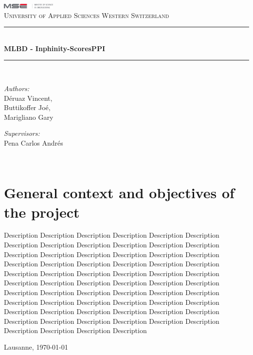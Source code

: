 \documentclass[a4paper,11pt]{report}
\newcommand{\School}{University of Applied Sciences Western Switzerland}
\newcommand{\Place}{Lausanne}
\newcommand{\Supervisors}{Pena Carlos Andrés}
\newcommand{\Authors}{Déruaz Vincent,\\ Buttikoffer Joé,\\ Marigliano Gary}
\newcommand{\Course}{MLBD - Inphinity-ScoresPPI}
\newcommand{\HRule}{\rule{\linewidth}{0.5mm}}
\begin{document}
\begin{titlepage}
    \begin{center}

        \includegraphics[width=0.2\textwidth]{img/mse_logo}~\\[0.2cm]
        \textsc{\small \School}\\[0.25cm]

        \HRule \\[0.2cm]
        { \large \bfseries \Course \\[0.05cm] }
        \HRule \\[0.5cm]

        \begin{minipage}[t]{0.4\textwidth}
            \begin{flushleft} \Large
                \emph{Authors:}\\ \Authors
            \end{flushleft}
        \end{minipage}
        \begin{minipage}[t]{0.4\textwidth}
            \begin{flushright} \Large
                \emph{Supervisors:}\\\Supervisors
            \end{flushright}
        \end{minipage}~\\[1.0cm]
        
        {\let\clearpage\relax \chapter{General context and objectives of the project}}

		Description Description Description Description Description Description Description Description Description Description Description Description Description Description Description Description Description Description Description Description Description Description Description Description Description Description Description Description Description Description Description Description Description Description Description Description Description Description Description Description Description Description Description Description Description Description Description Description Description Description Description Description Description Description Description Description Description Description Description Description Description Description Description Description 

        \vfill

        {\large \Place, \today}

    \end{center}
\end{titlepage}
\end{document}
